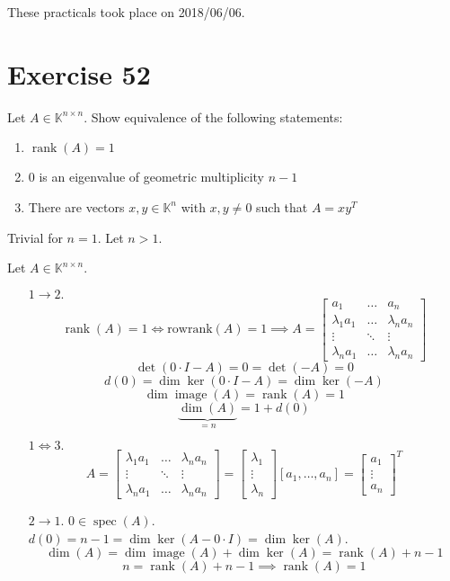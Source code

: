 \documentclass[a4paper]{article}
\theoremstyle{definition}
\DeclareMathOperator\image{image}
\newcommand\dateref[1]{These practicals took place on #1.\par}
\DeclareMathOperator\rank{rank}
\begin{document}
\dateref{2018/06/06}

\section*{Exercise 52}
\begin{ex}
  Let $A \in \mathbb K^{n \times n}$. Show equivalence of the following statements:
  \begin{enumerate}
    \item $\rank(A) = 1$
    \item $0$ is an eigenvalue of geometric multiplicity $n-1$
    \item There are vectors $x, y \in \mathbb K^n$ with $x, y \neq 0$ such that $A = xy^T$
  \end{enumerate}
\end{ex}

Trivial for $n = 1$. Let $n > 1$.

Let $A \in \mathbb K^{n \times n}$.
\begin{enumerate}
  \item[$1 \to 2.$]
    \[ \rank(A) = 1 \iff \text{rowrank}(A) = 1 \implies A = \begin{bmatrix} a_1 & \dots & a_n \\ \lambda_1 a_1 & \dots & \lambda_n a_n \\ \vdots & \ddots & \vdots \\ \lambda_n a_1 & \dots & \lambda_n a_n \end{bmatrix} \]
    \[ \det(0 \cdot I - A) = 0 = \det(-A) = 0 \]
    \[ d(0) = \dim\ker(0 \cdot I - A) = \dim\ker(-A) \]
    \[ \dim\image(A) = \rank(A) = 1 \]
    \[ \underbrace{\dim(A)}_{= n} = 1 + d(0) \]
  \item[$1 \iff 3.$]
    \[
      A
      = \begin{bmatrix} \lambda_1 a_1 & \dots & \lambda_n a_n \\ \vdots & \ddots & \vdots \\ \lambda_n a_1 & \dots & \lambda_n a_n \end{bmatrix}
      = \begin{bmatrix} \lambda_1 \\ \vdots \\ \lambda_n \end{bmatrix} [a_1, \dots, a_n]
      = \begin{bmatrix} a_1 \\ \vdots \\ a_n \end{bmatrix}^T
    \]
  \item[$2 \to 1.$]
    $0 \in \operatorname{spec}(A)$. $d(0) = n - 1 = \dim\ker(A - 0 \cdot I) = \dim\ker(A)$.
    \[ \dim(A) = \dim\image(A) + \dim\ker(A) = \rank(A) + n - 1 \]
    \[ n = \rank(A) + n - 1 \implies \rank(A) = 1 \]
\end{enumerate}
\end{document}
